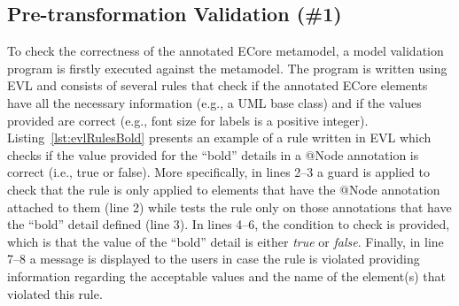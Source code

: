 \subsection{Pre-transformation Validation (\#1)}
To check the correctness of the annotated ECore metamodel, a model validation program is firstly executed against the metamodel.
The program is written using EVL and consists of several rules that check if the annotated ECore elements have all the necessary information (e.g., a UML base class) and if the values provided are correct (e.g., font size for labels is a positive integer). 
Listing~\ref{lst:evlRulesBold} presents an example of a rule written in EVL which checks if the value provided for the ``bold'' details in a @Node annotation is correct (i.e., true or false). More specifically, in lines 2--3 a guard is applied to check that the rule is only applied to elements that have the @Node annotation attached to them (line 2) while tests the rule only on those annotations that have the ``bold'' detail defined (line 3). 
In lines 4--6, the condition to check is provided, which is that the value of the ``bold'' detail is either \textit{true} or \textit{false}. 
Finally, in line 7--8 a message is displayed to the users in case the rule is violated providing information regarding the acceptable values and the name of the element(s) that violated this rule.




